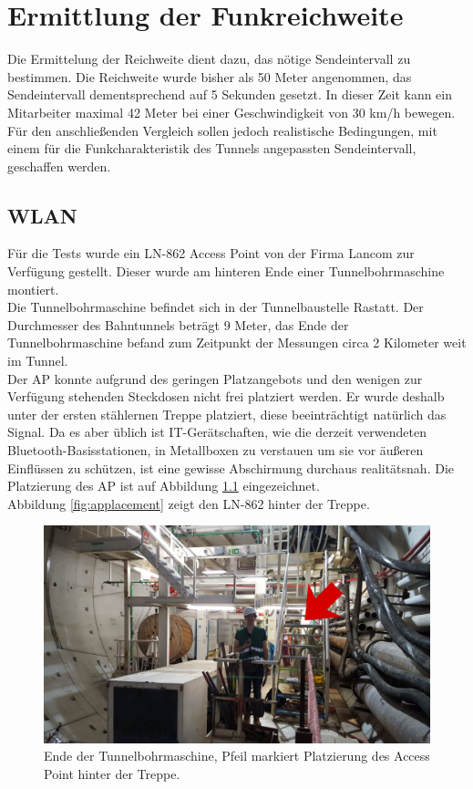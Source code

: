 \chapter{Ermittlung der Funkreichweite}
\label{ch:Reichweite}
Die Ermittelung der Reichweite dient dazu, das nötige Sendeintervall zu bestimmen.
Die Reichweite wurde bisher als 50 Meter angenommen, das Sendeintervall dementsprechend auf 5 Sekunden gesetzt.
In dieser Zeit kann ein Mitarbeiter maximal 42 Meter bei einer Geschwindigkeit von 30 km/h bewegen. 
Für den anschließenden Vergleich sollen jedoch realistische Bedingungen, mit einem für die Funkcharakteristik des Tunnels angepassten Sendeintervall, geschaffen werden.

\section{WLAN}
Für die Tests wurde ein LN-862 Access Point von der Firma Lancom zur Verfügung gestellt.
Dieser wurde am hinteren Ende einer Tunnelbohrmaschine montiert.\\
Die Tunnelbohrmaschine befindet sich in der Tunnelbaustelle Rastatt. 
Der Durchmesser des Bahntunnels beträgt 9 Meter, das Ende der Tunnelbohrmaschine befand zum Zeitpunkt der Messungen circa 2 Kilometer weit im Tunnel.\\
Der AP konnte aufgrund des geringen Platzangebots und den wenigen zur Verfügung stehenden Steckdosen nicht frei platziert werden.
Er wurde deshalb unter der ersten stählernen Treppe platziert, diese beeinträchtigt natürlich das Signal.
Da es aber üblich ist IT-Gerätschaften, wie die derzeit verwendeten Bluetooth-Basisstationen, in Metallboxen zu verstauen um sie vor äußeren Einflüssen zu schützen, ist eine gewisse Abschirmung durchaus realitätsnah.
Die Platzierung des AP ist auf Abbildung \ref{fig:tunnelmark} eingezeichnet.\\
Abbildung \ref{fig:applacement} zeigt den LN-862 hinter der Treppe.

\begin{figure}[h]
  \centering
	\includegraphics[width=\textwidth]{images/tunnelmark.png}
  \caption{Ende der Tunnelbohrmaschine, Pfeil markiert Platzierung des Access Point hinter der Treppe.}
  \label{fig:tunnelmark}
\end{figure}

